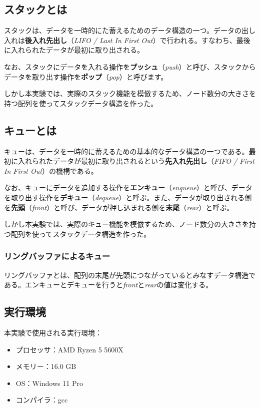 \documentclass[a4j, titlepage]{jarticle}
\begin{document}
    \subsection{スタックとは} 
        スタックは、データを一時的にた蓄えるためのデータ構造の一つ。データの出し入れは\textbf{後入れ先出し}（\textit{LIFO / Last In First Out}）で行われる。すなわち、最後に入れられたデータが最初に取り出される\cite{bib:boyoh}。

        なお、スタックにデータを入れる操作を\textbf{プッシュ}（\textit{push}）と呼び、スタックからデータを取り出す操作を\textbf{ポップ}（\textit{pop}）と呼びます\cite{bib:boyoh}。%

        しかし本実験では、実際のスタック機能を模倣するため、ノード数分の大きさを持つ配列を使ってスタックデータ構造を作った。

    \subsection{キューとは}
        キューは、データを一時的に蓄えるための基本的なデータ構造の一つである。最初に入れられたデータが最初に取り出されるという\textbf{先入れ先出し}（\textit{FIFO / First In First Out}）の機構である。\cite{bib:boyoh}
        
        なお、キューにデータを追加する操作を\textbf{エンキュー}（\textit{enqueue}）と呼び、データを取り出す操作を\textbf{デキュー}（\textit{dequeue}）と呼ぶ。また、データが取り出される側を\textbf{先頭}（\textit{front}）と呼び、データが押し込まれる側を\textbf{末尾}（\textit{rear}）と呼ぶ\cite{bib:boyoh}。

        しかし本実験では、実際のキュー機能を模倣するため、ノード数分の大きさを持つ配列を使ってスタックデータ構造を作った。

        \subsubsection{リングバッファによるキュー}
            リングバッファとは、配列の末尾が先頭につながっているとみなすデータ構造である\cite{bib:boyoh}。エンキューとデキューを行うと\textit{front}と\textit{rear}の値は変化する。


    
    \subsection{実行環境}
    本実験で使用される実行環境：
    \begin{screen}
        \begin{itemize}
            \item プロセッサ：AMD Ryzen 5 5600X
            \item メモリー：16.0 GB
            \item OS：Windows 11 Pro
            \item コンパイラ：gcc
        \end{itemize}    
    \end{screen}
\end{document}
